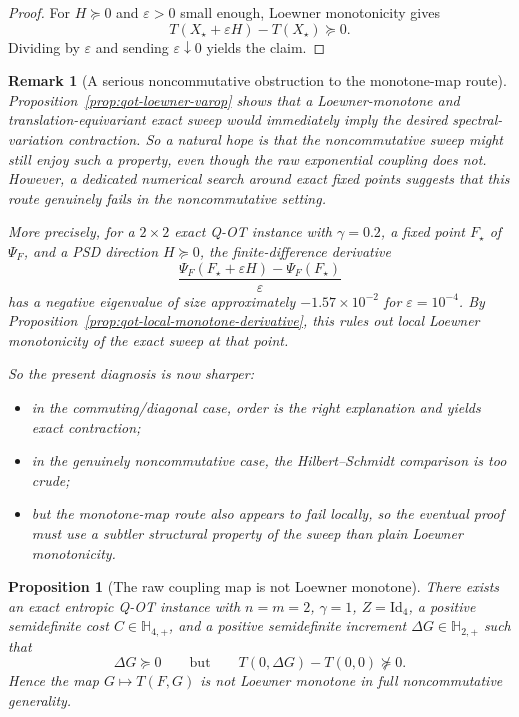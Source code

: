 \documentclass[11pt]{article}
\newcommand{\Id}{\mathrm{Id}}
\newcommand{\eps}{\varepsilon}
\newcommand{\Hh}{\mathbb{H}}
\theoremstyle{plain}
\newtheorem{proposition}{Proposition}[section]
\newtheorem{remark}{Remark}[section]
\begin{document}
\begin{proof}
For $H \succeq 0$ and $\eps>0$ small enough, Loewner monotonicity gives
\[
T(X_\star+\eps H)-T(X_\star)\succeq 0.
\]
Dividing by $\eps$ and sending $\eps \downarrow 0$ yields the claim.
\end{proof}

\begin{remark}[A serious noncommutative obstruction to the monotone-map route]
\label{rem:qot-sweep-not-locally-monotone}
Proposition~\ref{prop:qot-loewner-varop} shows that a Loewner-monotone and translation-equivariant exact sweep would immediately imply the desired spectral-variation contraction.
So a natural hope is that the noncommutative sweep might still enjoy such a property, even though the raw exponential coupling does not.
However, a dedicated numerical search around exact fixed points suggests that this route genuinely fails in the noncommutative setting.

More precisely, for a $2\times 2$ exact Q-OT instance with $\gamma=0.2$, a fixed point $F_\star$ of $\Psi_F$, and a PSD direction $H \succeq 0$, the finite-difference derivative
\[
\frac{\Psi_F(F_\star+\eps H)-\Psi_F(F_\star)}{\eps}
\]
has a negative eigenvalue of size approximately $-1.57\times 10^{-2}$ for $\eps=10^{-4}$.
By Proposition~\ref{prop:qot-local-monotone-derivative}, this rules out local Loewner monotonicity of the exact sweep at that point.

So the present diagnosis is now sharper:
\begin{itemize}[leftmargin=1.5em]
\item in the commuting/diagonal case, order is the right explanation and yields exact contraction;
\item in the genuinely noncommutative case, the Hilbert--Schmidt comparison is too crude;
\item but the monotone-map route also appears to fail locally, so the eventual proof must use a subtler structural property of the sweep than plain Loewner monotonicity.
\end{itemize}
\end{remark}

\begin{proposition}[The raw coupling map is not Loewner monotone]
\label{prop:qot-raw-not-monotone}
There exists an exact entropic Q-OT instance with $n=m=2$, $\gamma=1$, $Z=\Id_4$, a positive semidefinite cost $C \in \Hh_{4,+}$, and a positive semidefinite increment $\Delta G \in \Hh_{2,+}$ such that
\[
\Delta G \succeq 0
\qquad\text{but}\qquad
T(0,\Delta G)-T(0,0)\not\succeq 0.
\]
Hence the map $G \mapsto T(F,G)$ is not Loewner monotone in full noncommutative generality.
\end{proposition}
\end{document}

